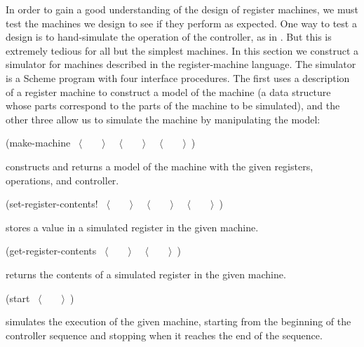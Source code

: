 In order to gain a good understanding of the design of register machines, we
must test the machines we design to see if they perform as expected.  One way
to test a design is to hand-simulate the operation of the controller, as in
.  But this is extremely tedious for all but the simplest
machines.  In this section we construct a simulator for machines described in
the register-machine language.  The simulator is a Scheme program with four
interface procedures.  The first uses a description of a register machine to
construct a model of the machine (a data structure whose parts correspond to
the parts of the machine to be simulated), and the other three allow us to
simulate the machine by manipulating the model:

\begin{niceQuote}

\begin{codeBlock}
(make-machine ~\(\langle \)~~~~\(\rangle \)~
              ~\(\langle \)~~~~\(\rangle \)~
              ~\(\langle \)~~~~\(\rangle \)~)
\end{codeBlock}

\noindent
constructs and returns a model of the machine with the given registers,
operations, and controller.

\begin{codeBlock}
(set-register-contents! ~\(\langle \)~~~~\(\rangle \)~
                        ~\(\langle \)~~~~\(\rangle \)~
                        ~\(\langle \)~~~~\(\rangle \)~)
\end{codeBlock}

\noindent
stores a value in a simulated register in the given machine.

\begin{codeBlock}
(get-register-contents ~\(\langle \)~~~~\(\rangle \)~
                       ~\(\langle \)~~~~\(\rangle \)~)
\end{codeBlock}

\noindent
returns the contents of a simulated register in the given machine.

\begin{codeBlock}
(start ~\(\langle \)~~~~\(\rangle \)~)
\end{codeBlock}

\noindent
simulates the execution of the given machine, starting from the beginning of
the controller sequence and stopping when it reaches the end of the sequence.
\end{niceQuote}

